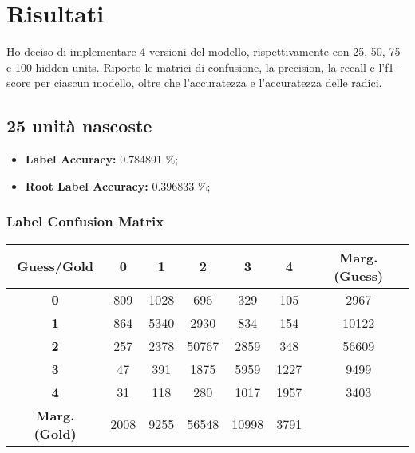 \section{Risultati}

Ho deciso di implementare 4 versioni del modello, rispettivamente con 25, 50, 75
e 100 hidden units. Riporto le matrici di confusione, la precision, la recall e
l'f1-score per ciascun modello, oltre che l'accuratezza e l'accuratezza delle
radici.

\subsection{25 unità nascoste}

\begin{itemize}
	\item \textbf{Label Accuracy:} 0.784891 \%;
	\item \textbf{Root Label Accuracy:} 0.396833 \%;
\end{itemize}

\subsubsection{Label Confusion Matrix}
\begin{table}[h]
	\centering
	\begin{tabular}{c|ccccc|c}
		\textbf{Guess/Gold}   & \textbf{0} & \textbf{1} & \textbf{2} & \textbf{3} & \textbf{4} & \textbf{Marg. (Guess)} \\
		\hline
		\textbf{0}            & 809        & 1028       & 696        & 329        & 105        & 2967                   \\
		\textbf{1}            & 864        & 5340       & 2930       & 834        & 154        & 10122                  \\
		\textbf{2}            & 257        & 2378       & 50767      & 2859       & 348        & 56609                  \\
		\textbf{3}            & 47         & 391        & 1875       & 5959       & 1227       & 9499                   \\
		\textbf{4}            & 31         & 118        & 280        & 1017       & 1957       & 3403                   \\
		\hline
		\textbf{Marg. (Gold)} & 2008       & 9255       & 56548      & 10998      & 3791       &                        \\
	\end{tabular}
\end{table}


